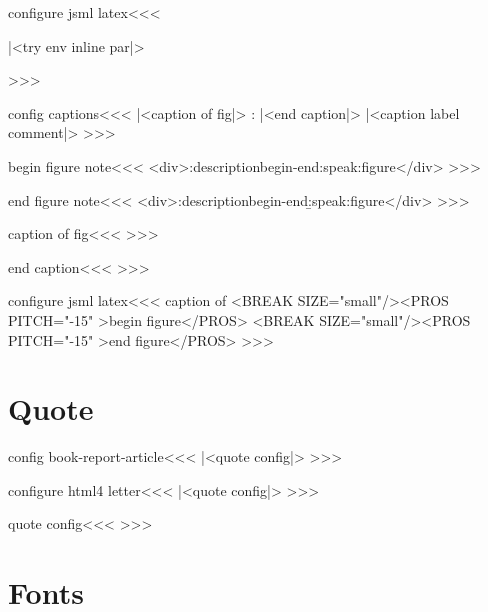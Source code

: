 \<configure jsml latex\><<<
   {\IgnorePar\EndP
    \bgroup {}%
   }
   {\egroup
    \IgnorePar\EndP{}%
    |<try env inline par|>\par}
   {}{}
>>>


\<config captions\><<<
   {\IgnorePar\EndP
    |<caption of fig|>}
   {: }
   {|<end caption|>} 
   {|<caption label comment|>}
>>>


\<begin figure note\><<<
<div>\add:description{begin-end}{\a:speak:figure}</div>%
>>>


\<end figure note\><<<
<div>\add:description{begin-end}{\b:speak:figure}</div>%
>>>

\<caption of fig\><<<
%
>>>

\<end caption\><<<
>>>

\<configure jsml latex\><<<
   {}
   {}
   {caption of}
   {<BREAK
       SIZE="small"/><PROS PITCH="-15" >begin figure</PROS>}
   {<BREAK
       SIZE="small"/><PROS PITCH="-15" >end figure</PROS>}
>>>

\section{Quote}


\<config book-report-article\><<<
|<quote config|>
>>>


\<configure html4 letter\><<< 
|<quote config|>
>>>

\<quote config\><<<
   {}{}
   {\IgnorePar\EndP
    }
   {\IgnorePar\EndP
    \ShowPar\ShowIndent}
>>>

\section{Fonts}


